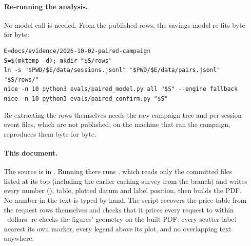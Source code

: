 \paragraph{Re-running the analysis.} No model call is needed. From the published rows, the savings model
re-fits byte for byte:
\begin{lstlisting}
E=docs/evidence/2026-10-02-paired-campaign
S=$(mktemp -d); mkdir "$S/rows"
ln -s "$PWD/$E/data/sessions.jsonl" "$PWD/$E/data/pairs.jsonl" "$S/rows/"
nice -n 10 python3 evals/paired_model.py all "$S" --engine fallback
nice -n 10 python3 evals/paired_confirm.py "$S"
\end{lstlisting}
Re-extracting the rows themselves needs the raw campaign tree and per-session event files, which are not
published; on the machine that ran the campaign,  reproduces them byte for byte.

\paragraph{This document.} The source is in . Running
 there runs , which reads only the committed files listed at its top
(including the earlier caching survey from the  branch) and writes every number
(), table, plotted datum and label position, then builds the PDF. No number in
the text is typed by hand. The script recovers the price table from the request rows themselves and checks
that it prices every request to within \PriceResidual\ dollars.  re-checks the figures'
geometry on the built PDF: every scatter label nearest its own marker, every legend above its plot, and no
overlapping text anywhere.
